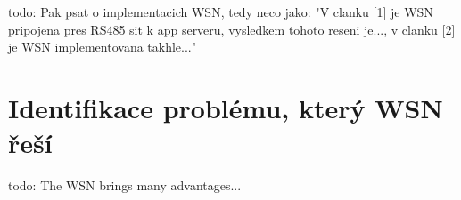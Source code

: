 todo: Pak psat o implementacich WSN, tedy neco jako:
"V clanku [1] je WSN pripojena pres RS485 sit k app serveru, vysledkem tohoto reseni je..., v clanku [2] je WSN implementovana takhle..."











\chapter{Identifikace problému, který WSN řeší}
todo: The WSN brings many advantages...























